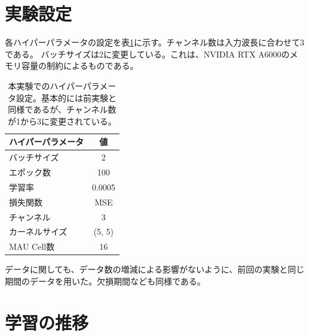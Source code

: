   \section{実験設定}
    各ハイパーパラメータの設定を表\ref{tab:exp2_hyperparameters}に示す。チャンネル数は入力波長に合わせて3である。
    バッチサイズは2に変更している。これは、NVIDIA RTX A6000のメモリ容量の制約によるものである。
    \begin{table}[htbp]
      \centering
      \begin{tabular}{lc}
      \hline
      ハイパーパラメータ & 値 \\
      \hline\hline
      バッチサイズ & 2 \\
      \hline
      エポック数 & 100 \\
      \hline
      学習率 & 0.0005 \\
      \hline
      損失関数 & MSE \\
      \hline
      チャンネル & 3 \\
      \hline
      カーネルサイズ & (5, 5) \\
      \hline
      MAU Cell数 & 16 \\
      \hline
      \end{tabular}
      \caption{本実験でのハイパーパラメータ設定。基本的には前実験と同様であるが、チャンネル数が1から3に変更されている。}
      \label{tab:exp2_hyperparameters}
    \end{table}
    データに関しても、データ数の増減による影響がないように、前回の実験と同じ期間のデータを用いた。欠損期間なども同様である。

  \section{学習の推移}
  
